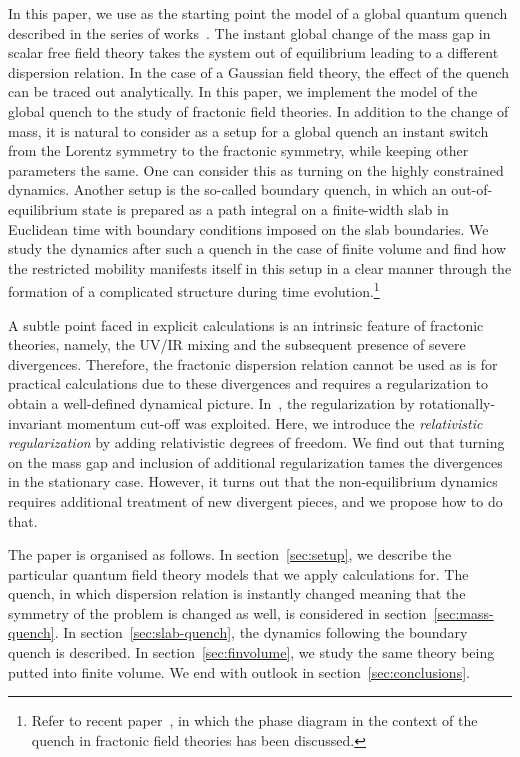 \documentclass[a4paper,12pt]{article}
\newcommand{\secref}[1]{section~\ref{#1}}
\begin{document}
In this paper, we use as the starting point the model of a global quantum quench described in the series of works~\cite{Calabrese:2007rg, Sotiriadis2009thermal, Sotiriadis:2010si}. The instant global change of the mass gap in scalar free field theory takes the system out of equilibrium leading to a different dispersion relation. In the case of a Gaussian field theory, the effect of the quench can be traced out analytically. In this paper, we implement the model of the global quench to the study of fractonic field theories. In addition to the change of mass, it is natural to consider as a setup for a global quench an instant switch from the Lorentz symmetry to the fractonic symmetry, while keeping other parameters the same. One can consider this as turning on the highly constrained dynamics. Another setup is the so-called boundary quench, in which an out-of-equilibrium state is prepared as a path integral on a finite-width slab in Euclidean time with boundary conditions imposed on the slab boundaries. We study the dynamics after such a quench in the case of finite volume and find how the restricted mobility manifests itself in this setup in a clear manner through the formation of a complicated structure during time evolution.\footnote{Refer to recent paper~\cite{Islam:2023cmm}, in which the phase diagram in the context of the quench in fractonic field theories has been discussed.}

A subtle point faced in explicit calculations is an intrinsic feature of fractonic theories, namely, the UV/IR mixing and the subsequent presence of severe divergences. Therefore, the fractonic dispersion relation cannot be used as is for practical calculations due to these divergences and requires a regularization to obtain a well-defined dynamical picture. In~\cite{Distler:2021bop}, the regularization by rotationally-invariant momentum cut-off was exploited. Here, we introduce the \textit{relativistic regularization} by adding relativistic degrees of freedom. We find out that turning on the mass gap and inclusion of additional regularization tames the divergences in the stationary case. However, it turns out that the non-equilibrium dynamics requires additional treatment of new divergent pieces, and we propose how to do that.

The paper is organised as follows. In \secref{sec:setup}, we describe the particular quantum field theory models that we apply calculations for. The quench, in which dispersion relation is instantly changed meaning that the symmetry of the problem is changed as well, is considered in \secref{sec:mass-quench}. In \secref{sec:slab-quench}, the dynamics following the boundary quench is described. In \secref{sec:finvolume}, we study the same theory being putted into finite volume. We end with outlook in \secref{sec:conclusions}.
\end{document}
